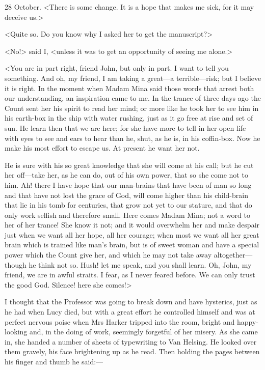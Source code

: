 \begin{diary}{28 October.}
<There is some change. It is a hope that makes me sick, for it may deceive us.>

<Quite so. Do you know why I asked her to get the manuscript?>

<No!> said I, <unless it was to get an opportunity of seeing me alone.>

<You are in part right, friend John, but only in part. I want to tell you something. And oh, my friend, I am taking a great—a terrible—risk; but I believe it is right. In the moment when Madam Mina said those words that arrest both our understanding, an inspiration came to me. In the trance of three days ago the Count sent her his spirit to read her mind; or more like he took her to see him in his earth-box in the ship with water rushing, just as it go free at rise and set of sun. He learn then that we are here; for she have more to tell in her open life with eyes to see and ears to hear than he, shut, as he is, in his coffin-box. Now he make his most effort to escape us. At present he want her not.

He is sure with his so great knowledge that she will come at his call; but he cut her off—take her, as he can do, out of his own power, that so she come not to him. Ah! there I have hope that our man-brains that have been of man so long and that have not lost the grace of God, will come higher than his child-brain that lie in his tomb for centuries, that grow not yet to our stature, and that do only work selfish and therefore small. Here comes Madam Mina; not a word to her of her trance! She know it not; and it would overwhelm her and make despair just when we want all her hope, all her courage; when most we want all her great brain which is trained like man's brain, but is of sweet woman and have a special power which the Count give her, and which he may not take away altogether—though he think not so. Hush! let me speak, and you shall learn. Oh, John, my friend, we are in awful straits. I fear, as I never feared before. We can only trust the good God. Silence! here she comes!>

I thought that the Professor was going to break down and have hysterics, just as he had when Lucy died, but with a great effort he controlled himself and was at perfect nervous poise when Mrs Harker tripped into the room, bright and happy-looking and, in the doing of work, seemingly forgetful of her misery. As she came in, she handed a number of sheets of typewriting to Van Helsing. He looked over them gravely, his face brightening up as he read. Then holding the pages between his finger and thumb he said:—


\end{diary}
